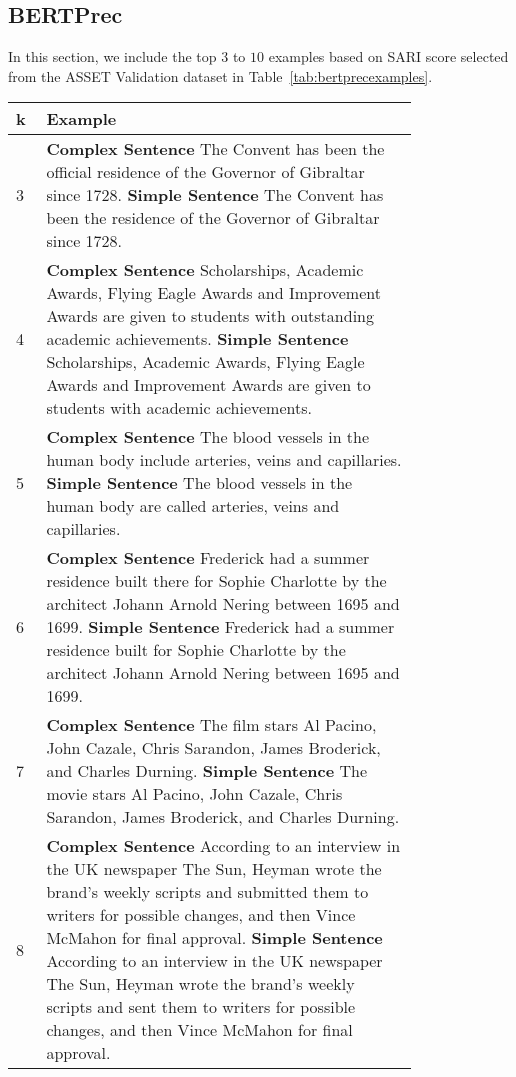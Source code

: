 \documentclass[11pt]{article}
\begin{document}
\subsection{BERTPrec}
\label{ssec:top10bertprec}

In this section, we include the top $3$ to $10$ examples based on SARI score selected from the ASSET Validation dataset in Table~\ref{tab:bertprecexamples}.

\begin{table*}[htbp]
\centering
\small
\renewcommand{\arraystretch}{1.5}
\begin{tabular}{p{0.05\linewidth} p{0.75\linewidth}} \toprule
k & Example \\ \midrule
3 & \textbf{Complex Sentence} The Convent has been the official residence of the Governor of Gibraltar since 1728. \newline \textbf{Simple Sentence} The Convent has been the residence of the Governor of Gibraltar since 1728.\\
\midrule
4 & \textbf{Complex Sentence} Scholarships, Academic Awards, Flying Eagle Awards and Improvement Awards are given to students with outstanding academic achievements. \newline \textbf{Simple Sentence} Scholarships, Academic Awards, Flying Eagle Awards and Improvement Awards are given to students with academic achievements.\\
\midrule
5 & \textbf{Complex Sentence} The blood vessels in the human body include arteries, veins and capillaries. \newline \textbf{Simple Sentence} The blood vessels in the human body are called arteries, veins and capillaries.\\
\midrule
6 & \textbf{Complex Sentence} Frederick had a summer residence built there for Sophie Charlotte by the architect Johann Arnold Nering between 1695 and 1699. \newline \textbf{Simple Sentence} Frederick had a summer residence built for Sophie Charlotte by the architect Johann Arnold Nering between 1695 and 1699.\\
\midrule
7 & \textbf{Complex Sentence} The film stars Al Pacino, John Cazale, Chris Sarandon, James Broderick, and Charles Durning. \newline \textbf{Simple Sentence} The movie stars Al Pacino, John Cazale, Chris Sarandon, James Broderick, and Charles Durning.\\
\midrule
8 & \textbf{Complex Sentence} According to an interview in the UK newspaper The Sun, Heyman wrote the brand's weekly scripts and submitted them to writers for possible changes, and then Vince McMahon for final approval. \newline \textbf{Simple Sentence} According to an interview in the UK newspaper The Sun, Heyman wrote the brand's weekly scripts and sent them to writers for possible changes, and then Vince McMahon for final approval.\\

\end{tabular}
\end{table*}
\end{document}
